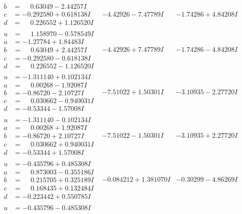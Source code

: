 \documentclass[1p]{elsarticle_modified}
\theoremstyle{definition}
\begin{document}
$$\begin{array}{c|c|c}
\begin{aligned}
b &= \phantom{-}0.63049 - 2.44257 I \\
c &= -0.292580 + 0.618138 I \\
d &= \phantom{-}0.226552 + 1.126520 I\end{aligned}
 & -4.42926 - 7.47789 I & -1.74286 + 4.84208 I \\ \hline\begin{aligned}
u &= \phantom{-}1.158970 - 0.578549 I \\
a &= -1.27784 + 1.84483 I \\
b &= \phantom{-}0.63049 + 2.44257 I \\
c &= -0.292580 - 0.618138 I \\
d &= \phantom{-}0.226552 - 1.126520 I\end{aligned}
 & -4.42926 + 7.47789 I & -1.74286 - 4.84208 I \\ \hline\begin{aligned}
u &= -1.311140 + 0.102134 I \\
a &= \phantom{-}0.00268 - 1.92087 I \\
b &= -0.86720 - 2.10727 I \\
c &= \phantom{-}0.030662 - 0.940031 I \\
d &= -0.53344 - 1.57008 I\end{aligned}
 & -7.51022 + 1.50301 I & -3.10935 - 2.27720 I \\ \hline\begin{aligned}
u &= -1.311140 - 0.102134 I \\
a &= \phantom{-}0.00268 + 1.92087 I \\
b &= -0.86720 + 2.10727 I \\
c &= \phantom{-}0.030662 + 0.940031 I \\
d &= -0.53344 + 1.57008 I\end{aligned}
 & -7.51022 - 1.50301 I & -3.10935 + 2.27720 I \\ \hline\begin{aligned}
u &= -0.435796 + 0.485308 I \\
a &= \phantom{-}0.873003 - 0.355186 I \\
b &= \phantom{-}0.215705 + 0.325189 I \\
c &= \phantom{-}0.168435 + 0.132484 I \\
d &= -0.223442 + 0.550785 I\end{aligned}
 & -0.084212 + 1.381070 I & -0.30299 - 4.86269 I \\ \hline\begin{aligned}
u &= -0.435796 - 0.485308 I \\

\end{aligned}
\end{array}$$
\end{document}
